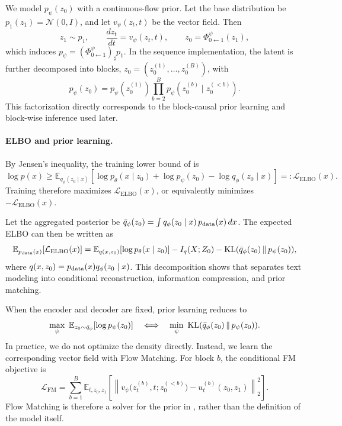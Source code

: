We model \(p_\psi(z_0)\) with a continuous-flow prior. Let the base distribution be \(p_1(z_1)=\mathcal N(0,I)\), and let \(v_\psi(z_t,t)\) be the vector field. Then
\begin{equation}
z_1\sim p_1,\qquad
\frac{dz_t}{dt}=v_\psi(z_t,t),\qquad
z_0=\Phi^\psi_{0\leftarrow 1}(z_1),
\label{eq:main_cnf_prior}
\end{equation}
which induces \(p_\psi=(\Phi^\psi_{0\leftarrow 1})_\sharp p_1\). In the sequence implementation, the latent is further decomposed into blocks, \(z_0=(z_0^{(1)},\ldots,z_0^{(B)})\), with
\begin{equation}
p_\psi(z_0)=p_\psi(z_0^{(1)})\prod_{b=2}^{B}p_\psi(z_0^{(b)}\mid z_0^{(<b)}).
\label{eq:main_block_prior}
\end{equation}
This factorization directly corresponds to the block-causal prior learning and block-wise inference used later.

\paragraph{\textbf{ELBO and prior learning.}}
By Jensen's inequality, the training lower bound of \method is
\begin{equation}
\log p(x)\ge
\mathbb E_{q_\phi(z_0\mid x)}
\!\left[
\log p_\theta(x\mid z_0)+\log p_\psi(z_0)-\log q_\phi(z_0\mid x)
\right]
=: \mathcal L_{\mathrm{ELBO}}(x).
\label{eq:main_elbo}
\end{equation}
Training therefore maximizes \(\mathcal L_{\mathrm{ELBO}}(x)\), or equivalently minimizes \(-\mathcal L_{\mathrm{ELBO}}(x)\).

Let the aggregated posterior be \(\bar q_\phi(z_0)=\int q_\phi(z_0\mid x)\,p_{\mathrm{data}}(x)\,dx\). The expected ELBO can then be written as
\begin{equation}
\mathbb E_{p_{\mathrm{data}}(x)}[\mathcal L_{\mathrm{ELBO}}(x)]
=
\mathbb E_{q(x,z_0)}[\log p_\theta(x\mid z_0)]
-
I_q(X;Z_0)
-
\mathrm{KL}(\bar q_\phi(z_0)\,\|\,p_\psi(z_0)),
\label{eq:main_avg_elbo}
\end{equation}
where \(q(x,z_0)=p_{\mathrm{data}}(x)q_\phi(z_0\mid x)\). This decomposition shows that \method separates text modeling into conditional reconstruction, information compression, and prior matching.

When the encoder and decoder are fixed, prior learning reduces to
\begin{equation}
\max_\psi\ \mathbb E_{z_0\sim \bar q_\phi}[\log p_\psi(z_0)]
\quad\Longleftrightarrow\quad
\min_\psi\ \mathrm{KL}(\bar q_\phi(z_0)\,\|\,p_\psi(z_0)).
\label{eq:main_prior_subproblem}
\end{equation}
In practice, we do not optimize the density directly. Instead, we learn the corresponding vector field with Flow Matching. For block \(b\), the conditional FM objective is
\begin{equation}
\mathcal L_{\mathrm{FM}}
=
\sum_{b=1}^{B}
\mathbb E_{t,z_0,z_1}
\left[
\left\|
v_\psi\!\bigl(z_t^{(b)},t;z_0^{(<b)}\bigr)-u_t^{(b)}(z_0,z_1)
\right\|_2^2
\right].
\label{eq:main_fm}
\end{equation}
Flow Matching is therefore a solver for the prior in \method, rather than the definition of the model itself.

